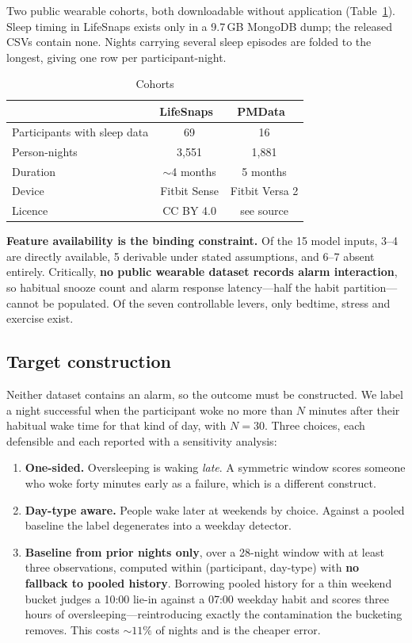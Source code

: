 \documentclass[conference]{IEEEtran}
\begin{document}
Two public wearable cohorts, both downloadable without application
(Table~\ref{tab:data}). Sleep timing in LifeSnaps exists only in a 9.7\,GB
MongoDB dump; the released CSVs contain none. Nights carrying several sleep
episodes are folded to the longest, giving one row per participant-night.

\begin{table}[t]
\caption{Cohorts}
\label{tab:data}
\centering
\small
\begin{tabular}{lcc}
\toprule
 & LifeSnaps~\cite{lifesnaps} & PMData~\cite{pmdata} \\
\midrule
Participants with sleep data & 69 & 16 \\
Person-nights & 3{,}551 & 1{,}881 \\
Duration & $\sim$4 months & 5 months \\
Device & Fitbit Sense & Fitbit Versa 2 \\
Licence & CC BY 4.0 & see source \\
\bottomrule
\end{tabular}
\end{table}

\textbf{Feature availability is the binding constraint.} Of the 15 model inputs,
3--4 are directly available, 5 derivable under stated assumptions, and 6--7
absent entirely. Critically, \textbf{no public wearable dataset records alarm
interaction}, so habitual snooze count and alarm response latency---half the
habit partition---cannot be populated. Of the seven controllable levers, only
bedtime, stress and exercise exist.

\subsection{Target construction}

Neither dataset contains an alarm, so the outcome must be constructed. We label
a night successful when the participant woke no more than $N$ minutes after
their habitual wake time for that kind of day, with $N = 30$. Three choices,
each defensible and each reported with a sensitivity analysis:

\begin{enumerate}
\item \textbf{One-sided.} Oversleeping is waking \emph{late}. A symmetric window
      scores someone who woke forty minutes early as a failure, which is a
      different construct.
\item \textbf{Day-type aware.} People wake later at weekends by choice. Against
      a pooled baseline the label degenerates into a weekday detector.
\item \textbf{Baseline from prior nights only}, over a 28-night window with at
      least three observations, computed within (participant, day-type) with
      \textbf{no fallback to pooled history}. Borrowing pooled history for a
      thin weekend bucket judges a 10:00 lie-in against a 07:00 weekday habit
      and scores three hours of oversleeping---reintroducing exactly the
      contamination the bucketing removes. This costs ${\sim}11\%$ of nights and
      is the cheaper error.
\end{enumerate}
\end{document}

